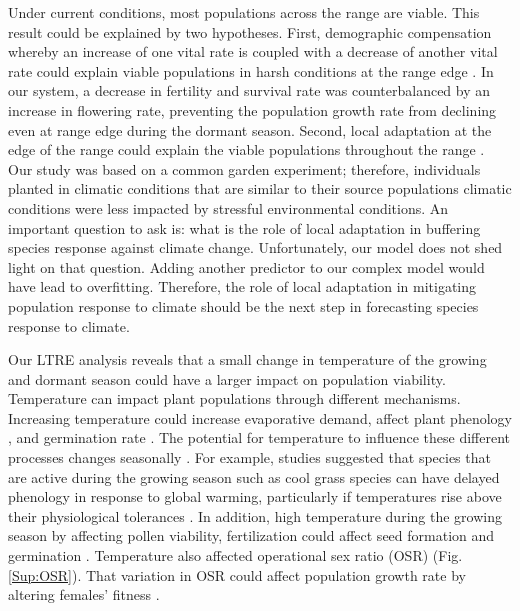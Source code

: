 \documentclass[12pt]{article}
\begin{document}
Under current conditions, most populations across the range are viable.
This result could be explained by two hypotheses.
First, demographic compensation whereby an increase of one vital rate is coupled with a decrease of another vital rate could explain viable populations in harsh conditions at the range edge \citep{doak2010demographic,villellas2015demographic,nomoto2021drivers}. 
In our system, a decrease in fertility and survival rate was counterbalanced by an increase in flowering rate, preventing the population growth rate from declining even at range edge during the dormant season.
Second, local adaptation at the edge of the range could explain the viable populations throughout the range \citep{miller2022two}. 
Our study was based on a common garden experiment; therefore, individuals planted in climatic conditions that are similar to their source populations climatic conditions were less impacted by stressful environmental conditions.
An important question to ask is: what is the role of local adaptation in buffering species response against climate change.
Unfortunately, our model does not shed light on that question.
Adding another predictor to our complex model would have lead to overfitting. 
Therefore, the role of local adaptation in mitigating population response to climate should be the next step in forecasting species response to climate. 

Our LTRE analysis reveals that a small change in temperature of the growing and dormant season could have a larger  impact on population viability.
Temperature can impact plant populations through different mechanisms. 
Increasing temperature could increase evaporative demand, affect plant phenology \citep{mclean2016predicting,sherry2007divergence,iler2019reproductive}, and germination rate \citep{reed2021climate}.
The potential for temperature to influence these different processes changes seasonally \citep{konapala2020climate}.
For example, studies suggested that species that are active during the growing season such as cool grass species can have delayed phenology in response to global warming, particularly if temperatures rise above their physiological tolerances \citep{cleland2007shifting,williams2015life}. 
In addition, high temperature during the growing season by affecting pollen viability, fertilization could affect seed formation and germination \citep{hatfield2015temperature,sletvold2015climate}. 
Temperature also affected operational sex ratio (OSR) (Fig.\ref{Sup:OSR}). 
That variation in OSR could affect population growth rate by altering females’ fitness \citep{petry2016sex,knight2005pollen,haridas2014frequency}. 
\end{document}
